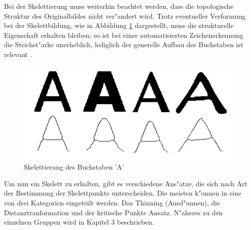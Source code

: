 Bei der Skelettierung muss weiterhin beachtet werden, dass die topologische Struktur des Originalbildes nicht ver"andert wird. Trotz eventueller Verformung bei der Skelettbildung, wie in Abbildung \ref{fig:topologischeStruktur} dargestellt, muss die strukturelle Eigenschaft erhalten bleiben; so ist bei einer automatisierten Zeichenerkennung die Strichst"arke unerheblich, lediglich der generelle Aufbau des Buchstaben ist relevant \cite{buhlmann}. \\
\begin{figure}
\centering
\includegraphics[width=0.7\linewidth]{./fig/topologischeStruktur}
\caption{Skelettierung des Buchstaben 'A'  \cite{buhlmann}}
\label{fig:topologischeStruktur}
\end{figure}


Um nun ein Skelett zu erhalten, gibt es verschiedene Ans"atze, die sich nach Art der Bestimmung der Skelettpunkte unterscheiden. Die meisten k"onnen in eine von drei Kategorien eingeteilt werden: Das Thinning (Ausd"unnen), die Distanztranformation und der kritische Punkte Ansatz. N"aheres zu den einzelnen Gruppen wird in Kapitel 3 beschrieben.


